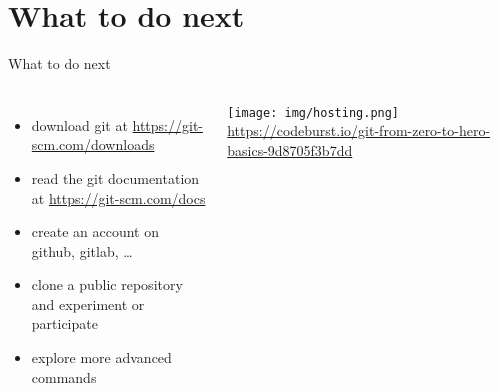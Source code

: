 \documentclass[10pt, graphics, aspectratio=169, table]{beamer}
\begin{document}
    \section{What to do next}
    \begin{frame}{What to do next}
        \begin{columns}
                \begin{itemize}
                    \item download git at \url{https://git-scm.com/downloads}
                    \item read the git documentation at \url{https://git-scm.com/docs}
                    \item create an account on github, gitlab, \ldots
                    \item clone a public repository and experiment or participate
                    \item explore more advanced commands
                \end{itemize}
                \center\texttt{[image: img/hosting.png]}
                \center\tiny\url{https://codeburst.io/git-from-zero-to-hero-basics-9d8705f3b7dd}
        \end{columns}
    \end{frame}
\end{document}

